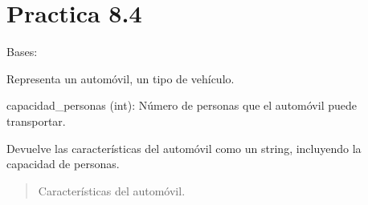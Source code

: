 \documentclass[letterpaper,10pt,spanish]{sphinxmanual}
\begin{document}
\section{Practica 8.4}
\label{\detokenize{pr8:module-pr8.4}}\label{\detokenize{pr8:practica-8-4}}

\begin{fulllineitems}
\label{\detokenize{pr8:pr8.4.Automovil}}
\pysigstartsignatures
{}
\pysigstopsignatures
\sphinxAtStartPar
Bases: {\hyperref[\detokenize{pr8:pr8.4.Vehiculo}]{}}

\sphinxAtStartPar
Representa un automóvil, un tipo de vehículo.
\begin{description}
\sphinxAtStartPar
capacidad\_personas (int): Número de personas que el automóvil puede transportar.

\end{description}

\begin{fulllineitems}
\label{\detokenize{pr8:pr8.4.Automovil.caracteristicas}}
\pysigstartsignatures
{}
\pysigstopsignatures
\sphinxAtStartPar
Devuelve las características del automóvil como un string, incluyendo la capacidad de personas.
\begin{quote}\begin{description}
\sphinxAtStartPar
Características del automóvil.

\end{description}\end{quote}

\end{fulllineitems}


\end{fulllineitems}
\end{document}
